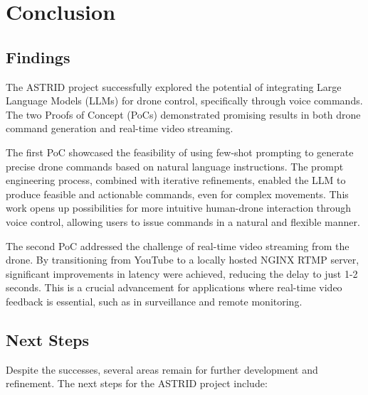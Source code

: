\chapter{Conclusion}
\label{conclusion}


\section{Findings}
The \ac{ASTRID} project successfully explored the potential of integrating Large Language Models (\acp{LLM}) for drone control, specifically through voice commands. 
The two Proofs of Concept (\acp{PoC}) demonstrated promising results in both drone command generation and real-time video streaming.

The first \ac{PoC} showcased the feasibility of using few-shot prompting to generate precise drone commands based on natural language instructions. 
The prompt engineering process, combined with iterative refinements, enabled the \ac{LLM} to produce feasible and actionable commands, even for complex movements. 
This work opens up possibilities for more intuitive human-drone interaction through voice control, allowing users to issue commands in a natural and flexible manner.

The second \ac{PoC} addressed the challenge of real-time video streaming from the drone. 
By transitioning from YouTube to a locally hosted NGINX \ac{RTMP} server, significant improvements in latency were achieved, reducing the delay to just 1-2 seconds. 
This is a crucial advancement for applications where real-time video feedback is essential, such as in surveillance and remote monitoring.

\section{Next Steps}
Despite the successes, several areas remain for further development and refinement. The next steps for the \ac{ASTRID} project include:

